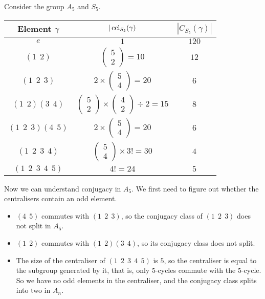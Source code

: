 \documentclass[../Main.tex]{subfiles}
\begin{document}
\begin{example}
    Consider the group $A_5$ and $S_5$.\par
    \begin{tabular}{c|c|c}
        Element $\gamma$ & $|\operatorname{ccl}_{S_5}(\gamma)$ & $|C_{S_5}(\gamma)|$ \\
        \hline
        $e$ & $1$ & $120$ \\
        $(1~~2)$ & $\begin{pmatrix}5 \\ 2\end{pmatrix} = 10$ & $12$ \\
        $(1~~2~~3)$ & $2\times\begin{pmatrix}5 \\ 4\end{pmatrix} = 20$ & $6$ \\
        $(1~~2)(3~~4)$ & $\begin{pmatrix}5 \\ 2\end{pmatrix}\times\begin{pmatrix}4 \\ 2\end{pmatrix} \div 2 = 15$ & $8$ \\
        $(1~~2~~3)(4~~5)$ & $2\times\begin{pmatrix}5 \\ 4\end{pmatrix} = 20$ & $6$ \\
        $(1~~2~~3~~4)$ & $\begin{pmatrix}5 \\ 4\end{pmatrix}\times3! = 30$ & $4$ \\
        $(1~~2~~3~~4~~5)$ & $4! = 24$ & $5$
    \end{tabular}\par
    Now we can understand conjugacy in $A_5$. We first need to figure out whether the centralisers contain an odd element.\par
    \begin{itemize}
        \item $(4~~5)$ commutes with $(1~~2~~3)$, so the conjugacy class of $(1~~2~~3)$ does not split in $A_5$.
        \item $(1~~2)$ commutes with  $(1~~2)(3~~4)$, so its conjugacy class does not split.
        \item The size of the centraliser of $(1~~2~~3~~4~~5)$ is $5$, so the centraliser is equal to the subgroup generated by it, that is, only 5-cycles commute with the 5-cycle. So we have no odd elements in the centraliser, and the conjugacy class splits into two in $A_n$.

\end{itemize}
\end{example}
\end{document}
